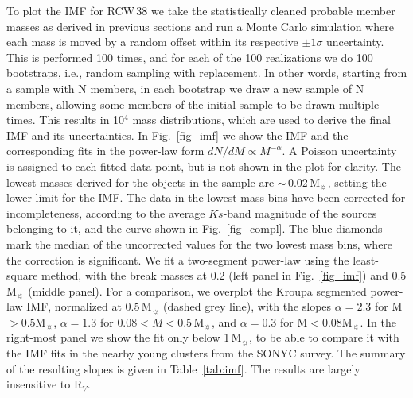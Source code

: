 \documentclass[a4paper,fleqn,usenatbib]{mnras}
\begin{document}
To plot the IMF for RCW\,38 we take the statistically cleaned probable member masses as derived in previous sections %
and run a Monte Carlo simulation where each mass is moved by a random offset within its respective $\pm1 \sigma$ uncertainty.
This is performed 100 times, and for each of the 100 realizations we do 100 bootstraps, i.e., random sampling with replacement.
In other words, starting from a sample with N members, in each bootstrap we draw a new sample of N members, allowing some members of the initial sample to be 
drawn multiple times.
 This results in
10$^4$ mass distributions, which are used to derive the final IMF and its uncertainties. 
In Fig.~\ref{fig_imf} we show the IMF and the corresponding fits in the power-law form $dN/dM\propto M^{-\alpha}$. 
A Poisson uncertainty is assigned to each fitted data point, but is not shown in the plot for clarity.
The lowest masses derived for the objects in the sample are $\sim\,$0.02\,M$_{\sun}$, setting the lower limit
for the IMF.
The data in the lowest-mass bins  
have been corrected for incompleteness, according to the average $Ks$-band magnitude of the sources belonging to it, and the curve shown
in Fig.~\ref{fig_compl}. The blue diamonds mark the median of the uncorrected values for the two lowest mass bins, where the correction is significant. 
We fit a two-segment power-law using the least-square method, with the break masses at 0.2 (left panel in Fig.~\ref{fig_imf}) and 0.5 M$_{\sun}$ (middle panel).
For a comparison, we overplot the Kroupa segmented power-law IMF, normalized at 0.5\,M$_{\sun}$ (dashed grey line), with the slopes $\alpha=2.3$ for M$>0.5$M$_{\sun}$, $\alpha=1.3$ for 
$0.08<M<0.5\,$M$_{\sun}$, and $\alpha=0.3$ for M$<0.08$M$_{\sun}$.
In the right-most panel we show the fit only below 1\,M$_{\sun}$, to be able to compare it with the IMF fits
in the nearby young clusters from the SONYC survey. The summary of the resulting slopes is given in Table~\ref{tab:imf}. 
The results are largely insensitive to R$_V$.
\end{document}
